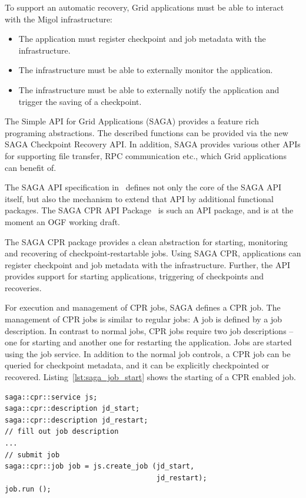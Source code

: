 \documentclass[times, 10pt,twocolumn]{article}
\begin{document}
To support an automatic recovery, Grid applications must be able to interact with the Migol infrastructure:
\begin{itemize}
    \item The application must register checkpoint and job metadata with the infrastructure.
    \item The infrastructure must be able to externally monitor the application.
    \item The infrastructure must be able to externally notify the application and trigger the saving of a checkpoint.
\end{itemize}  
The Simple API for Grid Applications (SAGA) provides a feature rich programing abstractions. The described functions 
can be  provided via the new SAGA Checkpoint Recovery API. In addition, SAGA provides  
various other APIs for supporting file transfer, RPC communication etc., which Grid applications can benefit of.



The SAGA API specification in~\cite{saga_gfd90} defines not only the
core of the SAGA API itself, but also the mechanism to extend that API
by additional functional packages.  The SAGA CPR API
Package~\cite{saga_cpr_draft} is such an API package, and is at the
moment an OGF working draft.

The SAGA CPR package provides a clean abstraction for starting,
monitoring and recovering of checkpoint-restartable jobs.
Using SAGA CPR, applications can register checkpoint and job metadata with the infrastructure. 
Further, the API provides support for starting applications, triggering of checkpoints and recoveries.

For execution and management of CPR jobs, SAGA defines a CPR job. The management of 
CPR jobs is similar to regular jobs: A job is defined by a job description. In contrast to normal jobs, 
CPR jobs require  two job descriptions -- one for starting and another one for restarting the application.
Jobs are started using the job service. In addition to the normal job controls, a CPR job can be queried for checkpoint metadata, and 
it can be explicitly checkpointed or recovered. Listing~\ref{lst:saga_job_start} shows the starting of a CPR enabled job.

\begin{lstlisting}[style=myListing, caption={SAGA CPR: Starting a Job with CPR Support},  label={lst:saga_job_start}]
saga::cpr::service js; 
saga::cpr::description jd_start;
saga::cpr::description jd_restart;
// fill out job description
...
// submit job  
saga::cpr::job job = js.create_job (jd_start, 
                                    jd_restart);
job.run ();
\end{lstlisting}
    
\end{document}
